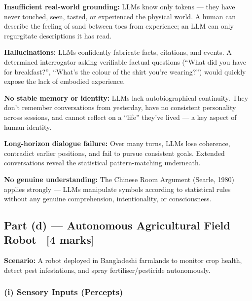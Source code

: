 \documentclass[12pt, a4paper]{article}
\newenvironment{solutionbox}{\begin{mdframed}[style=solutionframe]}{\end{mdframed}}
\begin{document}
\begin{keypoints}
  \item \textbf{Insufficient real-world grounding:} LLMs know only tokens — they have never touched, seen, tasted, or experienced the physical world. A human can describe the feeling of sand between toes from experience; an LLM can only regurgitate descriptions it has read.
  \item \textbf{Hallucinations:} LLMs confidently fabricate facts, citations, and events. A determined interrogator asking verifiable factual questions (``What did you have for breakfast?'', ``What's the colour of the shirt you're wearing?'') would quickly expose the lack of embodied experience.
  \item \textbf{No stable memory or identity:} LLMs lack autobiographical continuity. They don't remember conversations from yesterday, have no consistent personality across sessions, and cannot reflect on a ``life'' they've lived — a key aspect of human identity.
  \item \textbf{Long-horizon dialogue failure:} Over many turns, LLMs lose coherence, contradict earlier positions, and fail to pursue consistent goals. Extended conversations reveal the statistical pattern-matching underneath.
  \item \textbf{No genuine understanding:} The Chinese Room Argument (Searle, 1980) applies strongly — LLMs manipulate symbols according to statistical rules without any genuine comprehension, intentionality, or consciousness.
\end{keypoints}

\subsection{Part (d) — Autonomous Agricultural Field Robot \ [4 marks]}

\begin{solutionbox}
\textbf{Scenario:} A robot deployed in Bangladeshi farmlands to monitor crop health, detect pest infestations, and spray fertiliser/pesticide autonomously.
\end{solutionbox}

\subsubsection*{(i) Sensory Inputs (Percepts)}
\end{document}
